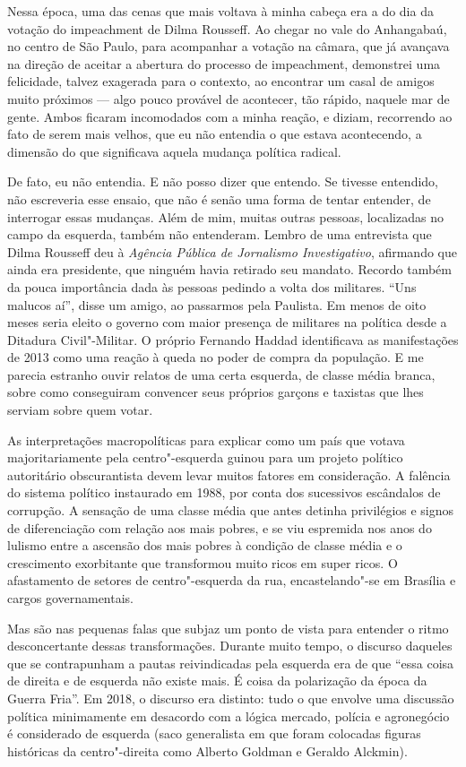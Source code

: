 Nessa época, uma das cenas que mais voltava à minha cabeça era a do dia
da votação do impeachment de Dilma Rousseff. Ao chegar no vale do
Anhangabaú, no centro de São Paulo, para acompanhar a votação na câmara,
que já avançava na direção de aceitar a abertura do processo de
impeachment, demonstrei uma felicidade, talvez exagerada para o contexto,
ao encontrar um casal de amigos muito próximos --- algo pouco provável de
acontecer, tão rápido, naquele mar de gente. Ambos ficaram incomodados
com a minha reação, e diziam, recorrendo ao fato de serem mais velhos,
que eu não entendia o que estava acontecendo, a dimensão do que
significava aquela mudança política radical.

De fato, eu não entendia. E não posso dizer que entendo. Se tivesse
entendido, não escreveria esse ensaio, que não é senão uma forma de
tentar entender, de interrogar essas mudanças. Além de mim, muitas
outras pessoas, localizadas no campo da esquerda, também não entenderam.
Lembro de uma entrevista que Dilma Rousseff deu à \emph{Agência Pública de Jornalismo Investigativo}, afirmando que ainda era presidente, que ninguém havia
retirado seu mandato. Recordo também da pouca importância dada às
pessoas pedindo a volta dos militares. ``Uns malucos aí'', disse um
amigo, ao passarmos pela Paulista. Em menos de oito meses seria eleito o
governo com maior presença de militares na política desde a Ditadura
Civil"-Militar. O próprio Fernando Haddad identificava as manifestações de 2013
como uma reação à queda no poder de compra da população. E me parecia
estranho ouvir relatos de uma certa esquerda, de classe média branca,
sobre como conseguiram convencer seus próprios garçons e taxistas que
lhes serviam sobre quem votar.

As interpretações macropolíticas para explicar como um país que votava
majoritariamente pela centro"-esquerda guinou para um projeto político
autoritário obscurantista devem levar muitos fatores em consideração. A
falência do sistema político instaurado em 1988, por conta dos
sucessivos escândalos de corrupção. A sensação de uma classe média que
antes detinha privilégios e signos de diferenciação com relação aos mais
pobres, e se viu espremida nos anos do lulismo entre a ascensão dos mais
pobres à condição de classe média e o crescimento exorbitante que
transformou muito ricos em super ricos. O afastamento de setores de
centro"-esquerda da rua, encastelando"-se em Brasília e cargos
governamentais.

Mas são nas pequenas falas que subjaz um ponto de vista para entender o
ritmo desconcertante dessas transformações. Durante muito tempo, o
discurso daqueles que se contrapunham a pautas reivindicadas pela
esquerda era de que ``essa coisa de direita e de esquerda não existe
mais. É coisa da polarização da época da Guerra Fria''. Em 2018, o
discurso era distinto: tudo o que envolve uma discussão política
minimamente em desacordo com a lógica mercado, polícia e agronegócio é
considerado de esquerda (saco generalista em que foram colocadas figuras
históricas da centro"-direita como Alberto Goldman e Geraldo Alckmin).

